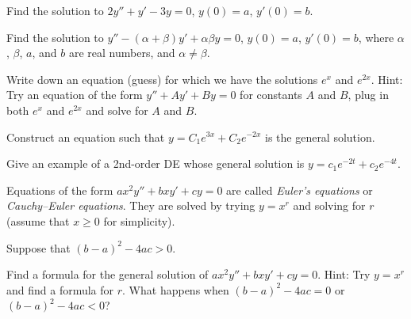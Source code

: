 \documentclass{ximera}
\begin{document}
\begin{exercise}%
    Find the solution to $2y''+y'-3y=0$, $y(0) = a$, $y'(0)=b$.
\end{exercise}

\begin{exercise}%
    Find the solution to $y''-(\alpha+\beta) y' + \alpha \beta y=0$, $y(0) = a$, $y'(0)=b$, where $\alpha$, $\beta$, $a$, and $b$ are real numbers, and $\alpha \not= \beta$.
\end{exercise}

\begin{exercise}%
    Write down an equation (guess) for which we have the solutions $e^x$ and $e^{2x}$.  Hint: Try an equation of the form $y''+Ay'+By = 0$ for constants $A$ and $B$, plug in both $e^x$ and $e^{2x}$ and solve for $A$ and $B$.
\end{exercise}

\begin{exercise}%
    Construct an equation such that $y = C_1 e^{3x} + C_2 e^{-2x}$ is the general solution.
\end{exercise}

\begin{exercise}
    Give an example of a 2nd-order DE whose general solution is $y=c_1e^{-2t}+c_2e^{-4t}$.
\end{exercise}


Equations of the form $a x^2 y'' + b x y' + c y = 0$ are called \emph{Euler's equations} or \emph{Cauchy--Euler equations}. They are solved by trying $y=x^r$ and solving for $r$ (assume that $x \geq 0$ for simplicity).

\begin{exercise} \label{sol:eulerex}
    Suppose that ${(b-a)}^2-4ac > 0$.
    \begin{tasks}
        \task Find a formula for the general solution of $a x^2 y'' + b x y' + c y = 0$.  Hint: Try $y=x^r$ and find a formula for $r$.
        \task What happens when ${(b-a)}^2-4ac = 0$ or ${(b-a)}^2-4ac < 0$?
    \end{tasks}
\end{exercise}
\end{document}
